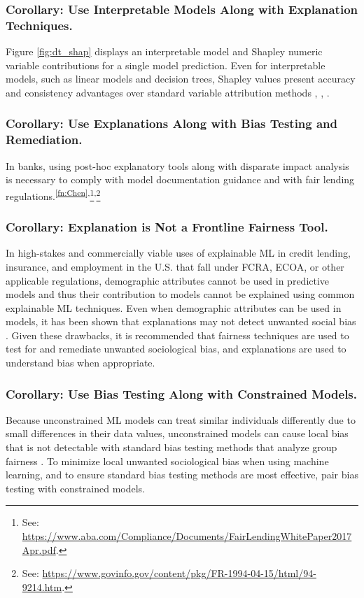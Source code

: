 \documentclass[sigconf]{acmart}
\begin{document}
\subsubsection{Corollary: Use Interpretable Models Along with Explanation Techniques.} Figure \ref{fig:dt_shap} displays an interpretable model and Shapley numeric variable contributions for a single model prediction. Even for interpretable models, such as linear models and decision trees, Shapley values present accuracy and consistency advantages over standard variable attribution methods \cite{lipovetsky2001analysis}, \cite{tree_shap}, \cite{shapley}. 

\subsubsection{Corollary: Use Explanations Along with Bias Testing and Remediation.} \label{cor:ex_bias} In banks, using post-hoc explanatory tools along with disparate impact analysis is necessary to comply with model documentation guidance and with fair lending regulations.\textsuperscript{\ref{fn:Chen},}\footnote{\scriptsize{See: \url{https://www.aba.com/Compliance/Documents/FairLendingWhitePaper2017Apr.pdf}.}}\textsuperscript{,}\footnote{\scriptsize{See: \url{https://www.govinfo.gov/content/pkg/FR-1994-04-15/html/94-9214.htm}.}} 

\subsubsection{Corollary: Explanation is Not a Frontline Fairness Tool.} \label{cor:ex_not} In high-stakes and commercially viable uses of explainable ML in credit lending, insurance, and employment in the U.S. that fall under FCRA, ECOA, or other applicable regulations, demographic attributes cannot be used in predictive models and thus their contribution to models cannot be explained using common explainable ML techniques. Even when demographic attributes can be used in models, it has been shown that explanations may not detect unwanted social bias \cite{fair_washing}. Given these drawbacks, it is recommended that fairness techniques are used to test for and remediate unwanted sociological bias, and explanations are used to understand bias when appropriate.  

\subsubsection{Corollary: Use Bias Testing Along with Constrained Models.} \label{cor:bias_con} Because unconstrained ML models can treat similar individuals differently due to small differences in their data values, unconstrained models can cause local bias that is not detectable with standard bias testing methods that analyze group fairness \cite{dwork2012fairness}. To minimize local unwanted sociological bias when using machine learning, and to ensure standard bias testing methods are most effective, pair bias testing with constrained models.\\
\end{document}
